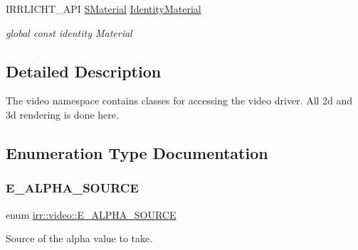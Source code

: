 \begin{DoxyCompactItemize}
\mbox{\label{namespaceirr_1_1video_a6c7a0046dcf64bb165eca2af94045a61}} 
I\+R\+R\+L\+I\+C\+H\+T\+\_\+\+A\+PI \hyperlink{classirr_1_1video_1_1SMaterial}{S\+Material} \hyperlink{namespaceirr_1_1video_a6c7a0046dcf64bb165eca2af94045a61}{Identity\+Material}
\begin{DoxyCompactList}\small\item\em global const identity Material \end{DoxyCompactList}\end{DoxyCompactItemize}


\subsection{Detailed Description}
The video namespace contains classes for accessing the video driver. All 2d and 3d rendering is done here. 

\subsection{Enumeration Type Documentation}
\mbox{\label{namespaceirr_1_1video_a08b237bb445ffc0f32932c8ed87c6e63}} 
\subsubsection{\texorpdfstring{E\+\_\+\+A\+L\+P\+H\+A\+\_\+\+S\+O\+U\+R\+CE}{E\_ALPHA\_SOURCE}\hspace{0.1cm}{\footnotesize\ttfamily [1/2]}}
{\footnotesize\ttfamily enum \hyperlink{namespaceirr_1_1video_a08b237bb445ffc0f32932c8ed87c6e63}{irr\+::video\+::\+E\+\_\+\+A\+L\+P\+H\+A\+\_\+\+S\+O\+U\+R\+CE}}



Source of the alpha value to take. 

